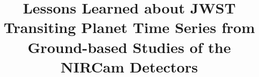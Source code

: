 \documentclass{aastex62}
\begin{document}
\title{Lessons Learned about JWST Transiting Planet Time Series from Ground-based Studies of the NIRCam Detectors}


\end{document}
